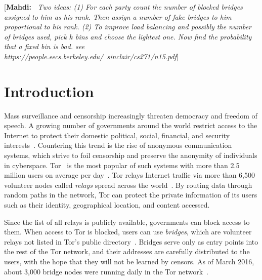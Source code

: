 \documentclass{llncs}
\newcommand{\mahdi}[1]{[{\bf Mahdi:\ } {\em #1}]}
\begin{document}
\mahdi{Two ideas: (1) For each party count the number of blocked bridges assigned to him as his rank. Then assign a number of fake bridges to him proportional to his rank. (2) To improve load balancing and possibly the number of bridges used, pick $k$ bins and choose the lightest one. Now find the probability that a fixed bin is bad. see https://people.eecs.berkeley.edu/~sinclair/cs271/n15.pdf}

\newpage

\section{Introduction}
Mass surveillance and censorship increasingly threaten democracy and freedom of speech. A growing number of governments around the world restrict access to the Internet to protect their domestic political, social, financial, and security interests~\cite{Turner:2016:Surveillance,Rushe:2012:Censorship}. Countering this trend is the rise of anonymous communication systems, which strive to foil censorship and preserve the anonymity of individuals in cyberspace. Tor~\cite{dingledine:2004} is the most popular of such systems with more than 2.5 million users on average per day~\cite{Tor:Users}. Tor relays Internet traffic via more than 6,500 volunteer nodes called \emph{relays} spread across the world~\cite{Tor:Relays}. By routing data through random paths in the network, Tor can protect the private information of its users such as their identity, geographical location, and content accessed.


Since the list of all relays is publicly available, governments can block access to them. %
When access to Tor is blocked, users can use \emph{bridges}, which are volunteer relays not listed in Tor's public directory~\cite{Dingledine06designof}. Bridges serve only as entry points into the rest of the Tor network, and their addresses are carefully distributed to the users, with the hope that they will not be learned by censors. 
As of March 2016, about 3,000 bridge nodes were running daily in the Tor network~\cite{Tor:Bridges}.
\end{document}
